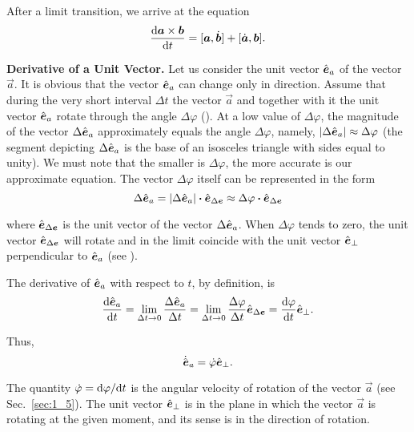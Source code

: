 \noindent
After a limit transition, we arrive at the equation
\begin{equation}\label{eq:1_55}
\frac{\mathrm{d}\boldsymbol{a}\times\boldsymbol{b}}{\mathrm{d} t} = [\boldsymbol{a},\dot{\boldsymbol{b}}] + [\dot{\boldsymbol{a}},\boldsymbol{b}].
\end{equation}

\textbf{Derivative of a Unit Vector.} Let us consider the unit vector $\hat{\boldsymbol{e}}_{a}$ of the vector $\vec{a}$. It is obvious that the vector $\hat{\boldsymbol{e}}_{a}$ can change only in direction. Assume that during the very short interval $\Delta t$ the vector $\vec{a}$ and together with it the unit vector $\hat{\boldsymbol{e}}_{a}$ rotate through the angle $\Delta\varphi$ (). At a low value of $\Delta\varphi$, the magnitude of the vector $\Delta\hat{\boldsymbol{e}}_{a}$ approximately equals the angle $\Delta\varphi$, namely, $|\Delta\hat{\boldsymbol{e}}_{a}|\approx\Delta\varphi$ (the segment depicting $\Delta\hat{\boldsymbol{e}}_{a}$ is the base of an isosceles triangle with sides equal to unity). We must note that the smaller is $\Delta\varphi$, the more accurate is our approximate equation. The vector $\Delta\varphi$ itself can be represented in the form 
\begin{equation*}
\Delta\hat{\boldsymbol{e}}_{a} = |\Delta\hat{\boldsymbol{e}}_{a}| \boldsymbol{\cdot} \hat{\boldsymbol{e}}_{\Delta\boldsymbol{e}} \approx \Delta\varphi \boldsymbol{\cdot} \hat{\boldsymbol{e}}_{\Delta\boldsymbol{e}}
\end{equation*}

\noindent
where $\hat{\boldsymbol{e}}_{\Delta\boldsymbol{e}}$ is the unit vector of the vector $\Delta\hat{\boldsymbol{e}}_{a}$. When $\Delta\varphi$ tends to zero, the unit vector $\hat{\boldsymbol{e}}_{\Delta\boldsymbol{e}}$ will rotate and in the limit coincide with the unit vector $\hat{\boldsymbol{e}}_{\perp}$ perpendicular to $\hat{\boldsymbol{e}}_{a}$ (see ).

The derivative of $\hat{\boldsymbol{e}}_{a}$ with respect to $t$, by definition, is
\begin{equation*}
\frac{\mathrm{d}\hat{\boldsymbol{e}}_{a}}{\mathrm{d} t} = \lim_{\Delta t\to 0} \frac{\Delta\hat{\boldsymbol{e}}_{a}}{\Delta t} = \lim_{\Delta t\to 0} \frac{\Delta\varphi}{\Delta t}\hat{\boldsymbol{e}}_{\Delta\boldsymbol{e}} = \frac{\mathrm{d}\varphi}{\mathrm{d} t}\hat{\boldsymbol{e}}_{\perp}.
\end{equation*}

\noindent
Thus,
\begin{equation}\label{eq:1_56}
\dot{\hat{\boldsymbol{e}}}_{a} = \dot{\varphi}\hat{\boldsymbol{e}}_{\perp}.
\end{equation}

\noindent
The quantity $\dot{\varphi}=\mathrm{d}\varphi/\mathrm{d} t$ is the angular velocity of rotation of the vector $\vec{a}$ (see Sec.~\ref{sec:1_5}). The unit vector $\hat{\boldsymbol{e}}_{\perp}$ is in the plane in which the vector $\vec{a}$ is rotating at the given moment, and its sense is in the direction of rotation.


